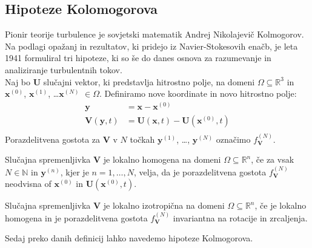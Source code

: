 \documentclass[mat2, tisk]{fmfdelo}
\newcommand{\R}{\mathbb R}
\newcommand{\N}{\mathbb N}
\newcommand{\bd}{\textbf}
\begin{document}
\subsection{Hipoteze Kolomogorova}
Pionir teorije turbulence je sovjetski matematik Andrej Nikolajevič Kolmogorov. 
Na podlagi opažanj in rezultatov, ki pridejo iz Navier-Stokesovih enačb, je
leta 1941 formuliral tri hipoteze, ki so še do danes osnova za 
razumevanje in analiziranje turbulentnih tokov.\\
\noindent
Naj bo $\bd{U}$ slučajni vektor, ki predstavlja hitrostno polje, 
na domeni $\Omega \subseteq \R^3$ in $\bd{x}^{(0)}$, $\bd{x}^{(1)}$, \dots $\bd{x}^{(N)}$ $\in \Omega$.
Definiramo nove koordinate in novo hitrostno polje:
\begin{align*}
\bd{y} &= \bd{x} - \bd{x}^{(0)} \\
\bd{V}(\bd{y}, t) &= \bd{U}(\bd{x}, t) - \bd{U}(\bd{x}^{(0)}, t) \\
\end{align*}
Porazdelitvena gostota za $\bd{V}$ v $N$ točkah $\bd{y}^{(1)}$, \dots, $\bd{y}^{(N)}$
označimo $f_{\bd{V}}^{(N)}$. 

\begin{definicija}
Slučajna spremenljivka $\bd{V}$ je lokalno homogena na domeni 
$\Omega \subseteq \R^n$, če za vsak $N\in \N$ in $\bd{y}^{(n)}$, 
kjer je $n = 1, \dots, N$, velja, da je porazdelitvena gostota 
$f_\bd{V}^{(N)}$ neodvisna of $\bd{x}^{(0)}$ in $\bd{U}(\bd{x}^{(0)}, t)$.
\end{definicija}

\begin{definicija}
Slučajna spremenljivka $\bd{V}$ je lokalno izotropična na domeni 
$\Omega \subseteq \R^n$, če je lokalno homogena in je porazdelitvena 
gostota $f_\bd{V}^{(N)}$ invariantna na rotacije in zrcaljenja.
\end{definicija}

Sedaj preko danih definicij lahko navedemo hipoteze Kolmogorova.
\end{document}
